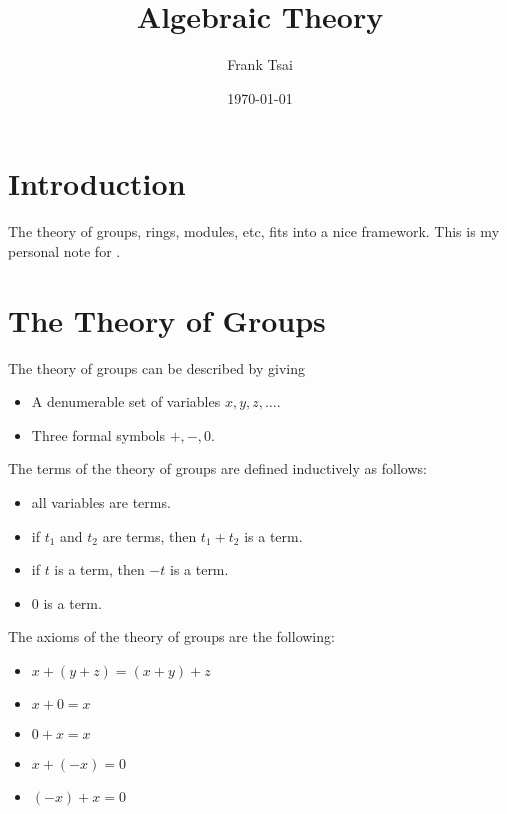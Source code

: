 \documentclass{amsart}
\title{Algebraic Theory}
\author{Frank Tsai}
\date{\today}
\begin{document}
\maketitle
\tableofcontents

\newcommand{\gmult}{\hat{+}}
\newcommand{\ginv}{\hat{-}}
\newcommand{\gid}{\hat{0}}
\newcommand{\interp}[1]{\llbracket #1 \rrbracket}

\section{Introduction}
\label{sec:introduction}

The theory of groups, rings, modules, etc, fits into a nice framework.
This is my personal note for \cite{borceaux:handbook-2}.

\section{The Theory of Groups}
\label{sec:the-theory-of-groups}

The theory of groups can be described by giving
\begin{itemize}
\item A denumerable set of variables $x, y, z, \ldots$.
\item Three formal symbols $+, -, 0$.
\end{itemize}

The terms of the theory of groups are defined inductively as follows:
\begin{itemize}
\item all variables are terms.
\item if $t_{1}$ and $t_{2}$ are terms, then $t_{1} + t_{2}$ is a term.
\item if $t$ is a term, then $-t$ is a term.
\item $0$ is a term.
\end{itemize}

The axioms of the theory of groups are the following:
\begin{itemize}
\item $x + (y + z) = (x + y) + z$
\item $x + 0 = x$
\item $0 + x = x$
\item $x + (-x) = 0$
\item $(-x) + x = 0$
\end{itemize}
\end{document}
